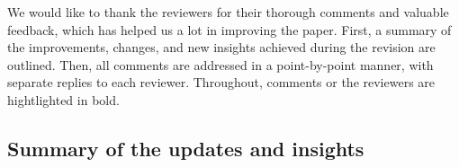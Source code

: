 \documentclass[11pt]{report}
\begin{document}
We would like to thank the reviewers for their thorough comments and valuable feedback, which has helped us a lot in improving the paper. First, a summary of the improvements, changes, and new insights achieved during the revision are outlined. Then, all comments are addressed in a point-by-point manner, with separate replies to each reviewer. 
Throughout, comments or the reviewers are hightlighted in bold.


\noindent \hdashrule{12.5cm}{0.2pt}{2mm 1pt}

\subsection*{Summary of the updates and insights}
\end{document}
